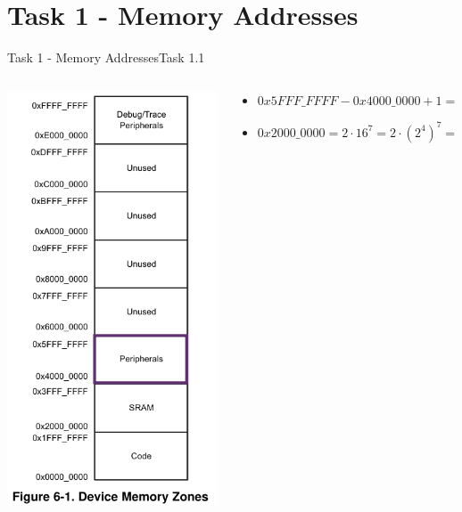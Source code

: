 
\section{Task 1 - Memory Addresses}

\begin{frame}{Task 1 - Memory Addresses}{Task 1.1}
  \begin{solution}
    \begin{columns}
      \begin{column}{0.2\textwidth}
        \includegraphics[height=0.5\paperheight]{./figures/peripherals.png}
      \end{column}
      \begin{column}{0.8\textwidth}
        \begin{itemize}
          \item $0x5FFF\_FFFF - 0x4000\_0000 + 1 = 0x2000\_0000$
          \item $0x2000\_0000 = 2 \cdot 16^7 = 2 \cdot {(2^4)}^7 = 2 \cdot 2^{4\cdot 7} = 2^{1+28} = 2^{29}$
        \end{itemize}
      \end{column}
    \end{columns}
  \end{solution}
\end{frame}

